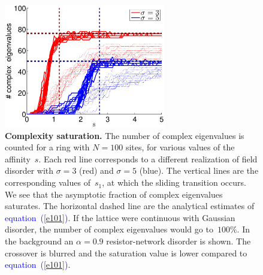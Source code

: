 \documentclass[aps,pre,floats,floatfix,twocolumn]{revtex4}
\newcommand{\Eq}[1]{\textcolor{blue}{{equation}\!~(\ref{#1})}}
\begin{document}
\begin{figure}
\includegraphics[height=5.4cm]{numComplex_100_alpha_sigma}

\caption{\label{figCplxSat}
{\bf Complexity saturation.}
The number of complex eigenvalues is counted for a ring with $N{=}100$ sites, 
for various values of the affinity~$s$. Each red line corresponds to a different
realization of field disorder with $\sigma{=}3$ (red) and $\sigma{=}5$ (blue). 
The vertical lines are the corresponding values of~$s_1$, 
at which the sliding transition occurs. 
We see that the asymptotic fraction of complex eigenvalues saturates. 
The horizontal dashed line are the analytical estimates of \Eq{e101}. 
If the lattice were continuous with Gaussian disorder, 
the number of complex eigenvalues would go to~$100\%$.
In the background an ${\alpha=0.9}$ resistor-network disorder is shown. 
The crossover is blurred and the saturation value is lower compared to \Eq{e101}.  
}
\end{figure}
\end{document}
